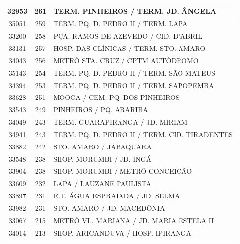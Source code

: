 \documentclass[
	12pt,				%
	oneside,			%
	a4paper,			%
	english,			%
	brazil				%
	]{abntex2ppgsi}
\begin{document}
{{\begin{apendicesenv}
\begin{longtable}{c|c|p{7cm}}
    32953 & 261   & TERM. PINHEIROS / TERM. JD. ÂNGELA \\
\hline

    35051 & 259   & TERM. PQ. D. PEDRO II / TERM. LAPA \\
\hline

    33200 & 258   & PÇA. RAMOS DE AZEVEDO / CID. D'ABRIL  \\
\hline

    33131 & 257   & HOSP. DAS CLÍNICAS / TERM. STO. AMARO \\
\hline

    34043 & 256   & METRÔ STA. CRUZ / CPTM AUTÓDROMO \\
\hline

    35143 & 254   & TERM. PQ. D. PEDRO II / TERM. SÃO MATEUS \\
\hline

    34394 & 253   & TERM. PQ. D. PEDRO II / TERM. SAPOPEMBA \\
\hline

    33628 & 251   & MOOCA / CEM. PQ. DOS PINHEIROS \\
\hline

    33543 & 249   & PINHEIROS / PQ. ARARIBA \\
\hline

    34049 & 243   & TERM. GUARAPIRANGA / JD. MIRIAM \\
\hline

    34941 & 243   & TERM. PQ. D. PEDRO II / TERM. CID. TIRADENTES \\
\hline

    33882 & 242   & STO. AMARO / JABAQUARA \\
\hline

    33548 & 238   & SHOP. MORUMBI / JD. INGÁ \\
\hline

    33904 & 238   & SHOP. MORUMBI / METRÔ CONCEIÇÃO \\
\hline

    33609 & 232   & LAPA / LAUZANE PAULISTA \\
\hline

    33897 & 231   & E.T. ÁGUA ESPRAIADA / JD. SELMA \\
\hline

    33982 & 231   & STO. AMARO / JD. MACEDÔNIA \\
\hline

    33067 & 215   & METRÔ VL. MARIANA / JD. MARIA ESTELA II \\
\hline

    34014 & 213   & SHOP. ARICANDUVA / HOSP. IPIRANGA \\
\hline


\end{longtable}
\end{apendicesenv}}}
\end{document}
